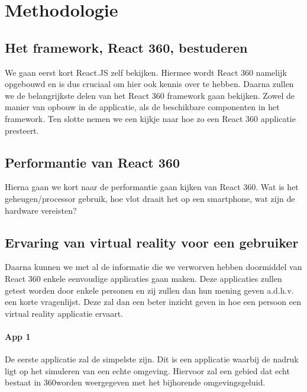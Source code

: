 
\chapter{Methodologie}
\label{ch:methodologie}


\section{Het framework, React 360, bestuderen}
\label{sec:reactvr-bestuderen}
We gaan eerst kort React.JS zelf bekijken. Hiermee wordt React 360 namelijk opgebouwd en is dus cruciaal om hier ook kennis over te hebben. Daarna zullen we de belangrijkste delen van het React 360 framework gaan bekijken. Zowel de manier van opbouw in de applicatie, als de beschikbare componenten in het framework. Ten slotte nemen we een kijkje naar hoe zo een React 360 applicatie presteert.

\section{Performantie van React 360}
\label{sec:performantie-react360}
Hierna gaan we kort naar de performantie gaan kijken van React 360. Wat is het geheugen/processor gebruik, hoe vlot draait het op een smartphone, wat zijn de hardware vereisten?

\section{Ervaring van virtual reality voor een gebruiker}
\label{sec:ervaring-vr-app}
Daarna kunnen we met al de informatie die we verworven hebben doormiddel van React 360 enkele eenvoudige applicaties gaan maken. Deze applicaties zullen getest worden door enkele personen en zij zullen dan hun mening geven a.d.h.v. een korte vragenlijst. Deze zal dan een beter inzicht geven in hoe een persoon een virtual reality applicatie ervaart.

\subsubsection{App 1}
De eerste applicatie zal de simpelste zijn. Dit is een applicatie waarbij de nadruk ligt op het simuleren van een echte omgeving. Hiervoor zal een gebied dat echt bestaat in 360\textdegree worden weergegeven met het bijhorende omgevingsgeluid. 

